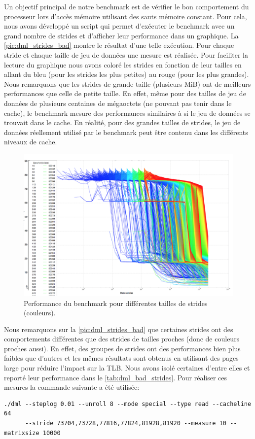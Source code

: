         Un objectif principal de notre benchmark est de vérifier le bon comportement du processeur lors d'accès mémoire utilisant des sauts mémoire constant. Pour cela, nous avons développé un script qui permet d'exécuter le benchmark avec un grand nombre de strides et d'afficher leur performance dans un graphique. La \autoref{pic:dml_strides_bad} montre le résultat d'une telle exécution. Pour chaque stride et chaque taille de jeu de données une mesure est réalisée. Pour faciliter la lecture du graphique nous avons coloré les strides en fonction de leur tailles en allant du bleu (pour les strides les plus petites) au rouge (pour les plus grandes). Nous remarquons que les strides de grande taille (plusieurs MiB) ont de meilleurs performances que celle de petite taille. En effet, même pour des tailles de jeu de données de plusieurs centaines de mégaoctets (ne pouvant pas tenir dans le cache), le benchmark mesure des performances similaires à si le jeu de données se trouvait dans le cache. En réalité, pour des grandes tailles de strides, le jeu de données réellement utilisé par le benchmark peut être contenu dans les différents niveaux de cache. 
      
        \begin{figure}
        \center
        \includegraphics[width=12cm]{images/dml_strides_bad.png}
        \caption{\label{pic:dml_strides_bad} Performance du benchmark pour différentes tailles de strides (couleurs).  }
        \end{figure}
        
        Nous remarquons sur la \autoref{pic:dml_strides_bad} que certaines strides ont des comportements différentes que des strides de tailles proches (donc de couleurs proches aussi). En effet, des groupes de strides ont des performances bien plus faibles que d'autres et les mêmes résultats sont obtenus en utilisant des pages large pour réduire l'impact sur la TLB. Nous avons isolé certaines d'entre elles et reporté leur performance dans le  \autoref{tab:dml_bad_strides}. Pour réaliser ces mesures la commande suivante a été utilisée: 
        \begin{verbatim}
./dml --steplog 0.01 --unroll 8 --mode special --type read --cacheline 64 
      --stride 73704,73728,77816,77824,81928,81920 --measure 10 --matrixsize 10000
        \end{verbatim}
        
